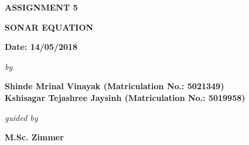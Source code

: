 \begin{center}
\vspace{-2.2cm}
\vspace{2.5cm}
\bfseries{ASSIGNMENT 5}\\
\vspace{0.5cm}
\begin{large}
{\bfseries SONAR EQUATION }\\
\end{large}
\vspace{0.5cm}
{\bfseries Date: 14/05/2018 }\\
\vspace{0.4cm}
\begin{small}
\emph{by}\\
\end{small}
\vspace{0.4cm}
\bfseries{Shinde Mrinal Vinayak (Matriculation No.: 5021349)\\Kshisagar Tejashree Jaysinh (Matriculation No.: 5019958)}\\
\vspace{0.3cm}
\begin{small}
\emph{guided by}\\
\end{small}
\vspace{0.3cm}
{\bfseries \large M.Sc. Zimmer}\\
\vspace{0.1cm}
\end{center}